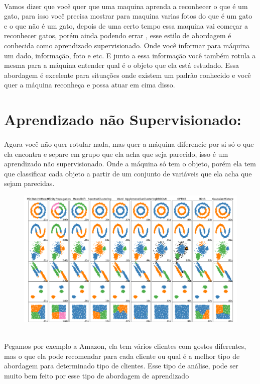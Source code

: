 \documentclass{article}
\begin{document}
    \paragraph{}Vamos dizer que você quer que uma maquina aprenda a reconhecer o que é um gato, para isso você
    precisa mostrar para maquina varias fotos do que é um gato e o que não é um gato, depois de uma
    certo tempo essa maquina vai começar a reconhecer gatos, porém ainda podendo errar , esse estilo
    de abordagem é conhecida como aprendizado supervisionado. Onde você informar para máquina um dado, informação, foto e etc. E junto a essa informação você também rotula a mesma para a máquina entender qual é o objeto que ela está estudado.  
    Essa abordagem é excelente para situações onde existem um padrão conhecido e você quer a máquina 
    reconheça e possa atuar em cima disso.


    \section{Aprendizado não Supervisionado:}
    \paragraph{} Agora você não quer rotular nada, mas quer a máquina diferencie por si só o que ela encontra
    e separe em grupo que ela acha que seja parecido, isso é um aprendizado não supervisionado.
    Onde a máquina só tem o objeto, porém ela tem que classificar cada objeto a partir de um
    conjunto de variáveis  que ela acha que sejam parecidas. 
    \\
      \begin{figure}[ht]
        \centering
        \includegraphics[scale = 0.3]{classificação de grupos.png}
    \end{figure}
    \\
    Pegamos por exemplo a Amazon,
    ela tem vários clientes com gostos diferentes, mas o que ela pode recomendar para cada cliente
    ou qual é a melhor tipo de abordagem para determinado tipo de clientes. Esse tipo de análise,
    pode ser muito bem feito por esse tipo de abordagem de aprendizado   
\end{document}
